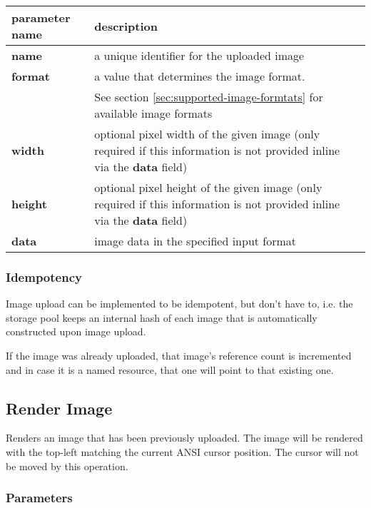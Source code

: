 \documentclass[a4paper]{article}
\begin{document}
\begin{tabular}{|l|l|l|}
  \hline
  \textbf{parameter name} & \textbf{description} \\
  \hline
  \textbf{name}           & a unique identifier for the uploaded image \\
  \textbf{format}         & a value that determines the image format. \\
                          & See section \ref{sec:supported-image-formtats} for available image formats \\
  \textbf{width}          & optional pixel width of the given image
                            (only required if this information is not provided
                            inline via the \textbf{data} field) \\
  \textbf{height}         & optional pixel height of the given image
                            (only required if this information is not provided
                            inline via the \textbf{data} field) \\
  \textbf{data}           & image data in the specified input format \\
  \hline
\end{tabular}

\subsubsection{Idempotency}

Image upload can be implemented to be idempotent, but don't have to,
i.e. the storage pool keeps an internal hash of each image that is
automatically constructed upon image upload.

If the image was already uploaded, that image's reference count is incremented
and in case it is a named resource, that one will point to that existing one.

\subsection{Render Image} %

Renders an image that has been previously uploaded.
The image will be rendered with the top-left matching the current ANSI cursor position.
The cursor will not be moved by this operation.

\subsubsection*{Parameters}
\end{document}
